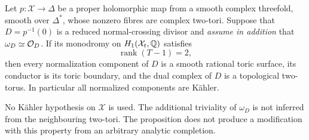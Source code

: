 \begin{proposition}
Let $p:\mathcal X\to\Delta$ be a proper holomorphic map
from a smooth complex threefold, smooth over $\Delta^*$,
whose nonzero fibres are complex two-tori. Suppose that
$D=p^{-1}(0)$ is a reduced normal-crossing divisor and
\emph{assume in addition} that $\omega_D\simeq\mathcal O_D$.
If its monodromy on $H_1(\mathcal X_t,\mathbb Q)$ satisfies
\[
 \operatorname{rank}(T-1)=2,                         \tag{B.4.28.1}
\]
then every normalization component of $D$ is a smooth
rational toric surface, its conductor is its toric
boundary, and the dual complex of $D$ is a topological
two-torus. In particular all normalized components are
K\"ahler.

No K\"ahler hypothesis on $\mathcal X$ is used. The
additional triviality of $\omega_D$ is not inferred from
the neighbouring two-tori. The proposition does not
produce a modification with this property from an
arbitrary analytic completion.
\end{proposition}
